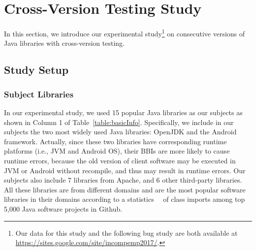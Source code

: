 \section{Cross-Version Testing Study}
\label{sec:studylib}
In this section, we introduce our experimental study\footnote{Our data for this study and the following bug study are both available at \url{https://sites.google.com/site/incompemp2017/}.} on consecutive versions of Java libraries with cross-version testing. 

\subsection{Study Setup}
\subsubsection{Subject Libraries}
In our experimental study, we used 15 popular Java libraries as our subjects as shown in Column 1 of Table~\ref{table:basicInfo}. Specifically, we include in our subjects the two most widely used Java libraries: OpenJDK and the Android framework. Actually, since these two libraries have corresponding runtime platforms (i.e., JVM and Android OS), their BBIs are more likely to cause runtime errors, because the old version of client software may be executed in JVM or Android without recompile, and thus may result in runtime errors. Our subjects also include 7 libraries from Apache, and 6 other third-party libraries. All these libraries are from different domains and are the most popular software libraries in their domains according to a statistics~\cite{MockStudy}~\cite{techstat} of class imports among top 5,000 Java software projects in Github.



